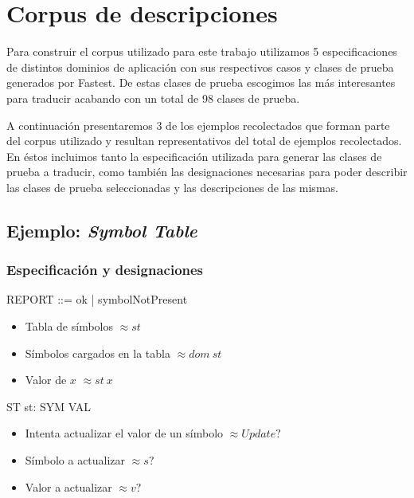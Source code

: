 \chapter{Corpus de descripciones}
\label{ape:corpus}

Para construir el corpus utilizado para este trabajo utilizamos 5 especificaciones de distintos dominios de aplicación con sus respectivos casos y clases de prueba generados por Fastest. De estas clases de prueba escogimos las más interesantes para traducir acabando con un total de 98 clases de prueba.

A continuación presentaremos 3 de los ejemplos recolectados que forman parte del corpus utilizado y resultan representativos del total de ejemplos recolectados. En éstos incluimos tanto la especificación utilizada para generar las clases de prueba a traducir, como también las designaciones necesarias para poder describir las clases de prueba seleccionadas y las descripciones de las mismas.

\section*{Ejemplo: \textit{Symbol Table}}

\subsection*{Especificación y designaciones}

\begin{zed}
 \also
REPORT ::= ok | symbolNotPresent
\end{zed}

\begin{itemize}
  \item Tabla de símbolos $\approx st$ \\
  \item Símbolos cargados en la tabla $\approx dom~st$ \\
  \item Valor de $x$ $\approx st~x$ 
\end{itemize}

\begin{schema}{ST}
st: SYM \pfun VAL
\end{schema}

\begin{itemize}
  \item Intenta actualizar el valor de un símbolo $\approx Update?$ \\
  \item Símbolo a actualizar $\approx s?$ \\
  \item Valor a actualizar  $\approx v?$ 
\end{itemize}

